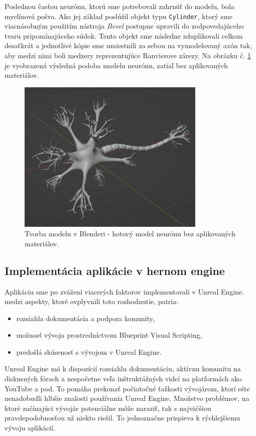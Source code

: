 Poslednou časťou neurónu, ktorú sme potrebovali zahrnúť do modelu, bola myelínová pošva. Ako jej základ poslúžil objekt typu \texttt{Cylinder}, ktorý sme viacnásobným použitím nástroja \emph{Bevel} postupne
upravili do zodpovedajúceho tvaru pripomínajúceho súdok. Tento objekt sme následne zduplikovali celkom desaťkrát a jednotlivé kópie sme umiestnili za sebou na vymodelovaný axón tak, aby medzi 
nimi boli medzery reprezentujúce Ranvierove zárezy. Na obrázku č. \ref{blender5} je vyobrazená výsledná podoba modelu neurónu, zatiaľ bez aplikovaných materiálov.
 
\begin{figure}[!htbp]
  \centering
  \includegraphics[width=9cm]{img/finalModel-crop.png}
  \caption{Tvorba modelu v Blenderi - hotový model neurónu bez aplikovaných materiálov.}
  \label{blender5}
\end{figure}

\subsection{Implementácia aplikácie v hernom engine}
Aplikáciu sme po zvážení viacerých faktorov implementovali v Unreal Engine. medzi aspekty, ktoré ovplyvnili toto rozhodnutie, patria:
\begin{itemize}
  \item rozsiahla dokumentácia a podpora komunity,
  \item možnosť vývoja prostredníctvom Blueprint Visual Scripting,
  \item predošlá skúsenosť s vývojom v Unreal Engine.
\end{itemize}

Unreal Engine má k dispozícií rozsiahlu dokumentáciu, aktívnu komunitu na diskusných fórach a nespočetne veľa inštruktážných videí na platformách ako YouTube a pod. To pomáha prekonať počiatočné
ťažkosti vývojárom, ktorí ešte nenadobudli hlbšie znalosti používania Unreal Engine. Množstvo problémov, na ktoré začínajúci vývojár potenciálne môže naraziť, tak s najväčšiou pravdepodobnosťou
už niekto riešil. To jednoznačne prispieva k rýchlejšiemu vývoju aplikácií.

